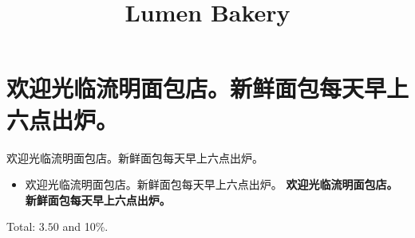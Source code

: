 \documentclass{article}
\title{Lumen Bakery}
\begin{document}
\maketitle
\section{欢迎光临流明面包店。新鲜面包每天早上六点出炉。}
欢迎光临流明面包店。新鲜面包每天早上六点出炉。

\begin{itemize}
\item 欢迎光临流明面包店。新鲜面包每天早上六点出炉。 \textbf{欢迎光临流明面包店。新鲜面包每天早上六点出炉。}
\end{itemize}
Total: $3.50$ and 10\%.
\end{document}
